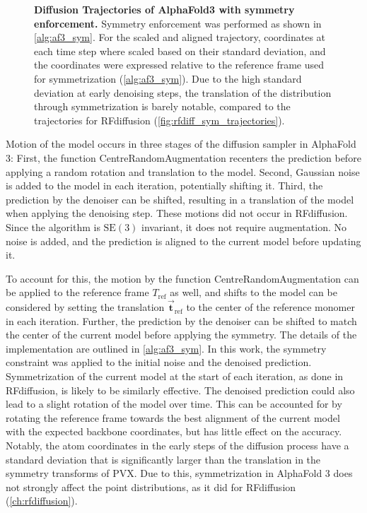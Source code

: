 \begin{figure}[!htb]

\caption{\textbf{Diffusion Trajectories of AlphaFold3 with symmetry enforcement. } Symmetry enforcement was performed as shown in \autoref{alg:af3_sym}. For the scaled and aligned trajectory, coordinates at each time step where scaled based on their standard deviation, and the coordinates were expressed relative to the reference frame used for symmetrization (\autoref{alg:af3_sym}). Due to the high standard deviation at early denoising steps, the translation of the distribution through symmetrization is barely notable, compared to the trajectories for RFdiffusion (\autoref{fig:rfdiff_sym_trajectories}).}
\label{fig:af3_sym_traj}
\end{figure}

Motion of the model occurs in three stages of the diffusion sampler in AlphaFold 3: First, the function CentreRandomAugmentation recenters the prediction before applying a random rotation and translation to the model. Second, Gaussian noise is added to the model in each iteration, potentially shifting it. Third, the prediction by the denoiser can be shifted, resulting in a translation of the model when applying the denoising step. These motions did not occur in RFdiffusion. Since the algorithm is $\mathrm{SE}(3)$ invariant, it does not require augmentation. No noise is added, and the prediction is aligned to the current model before updating it. 


To account for this, the motion by the function CentreRandomAugmentation can be applied to the reference frame $T_\text{ref}$ as well, and shifts to the model can be considered by setting the translation $\vec{\mathbf{t}}_{\text{ref}}$ to the center of the reference monomer in each iteration. Further, the prediction by the denoiser can be shifted to match the center of the current model before applying the symmetry. The details of the implementation are outlined in \autoref{alg:af3_sym}. In this work, the symmetry constraint was applied to the initial noise and the denoised prediction. Symmetrization of the current model at the start of each iteration, as done in RFdiffusion, is likely to be similarly effective. The denoised prediction could also lead to a slight rotation of the model over time. This can be accounted for by rotating the reference frame towards the best alignment of the current model with the expected backbone coordinates, but has little effect on the accuracy. Notably, the atom coordinates in the early steps of the diffusion process have a standard deviation that is significantly larger than the translation in the symmetry transforms of PVX. Due to this, symmetrization in AlphaFold 3 does not strongly affect the point distributions, as it did for RFdiffusion (\autoref{ch:rfdiffusion}).

